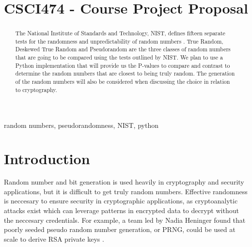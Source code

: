 \documentclass[11pt,letterpaper,conference]{IEEEtran}
\begin{document}
\title{CSCI474 - Course Project Proposal}

\author{
\and
{}
\and
{}
\and
{}
\and
{}
\and
{}
}

\maketitle

\begin{abstract}
The National Institute of Standards and Technology, NIST, defines fifteen separate tests
for the randomness and unpredictability of random numbers \cite{nistbook}. True Random, Deskewed True
Random and Pseudorandom are the three classes of random numbers that are going to be
compared using the tests outlined by NIST. We plan to use a Python implementation that will
provide us the P-values to compare and contrast to determine the random numbers that are
closest to being truly random. The generation of the random numbers will also be considered
when discussing the choice in relation to cryptography.
\end{abstract}

\begin{IEEEkeywords}
random numbers, pseudorandomness, NIST, python
\end{IEEEkeywords}

\section{Introduction}
Random number and bit generation is used heavily in cryptography and security applications, but it
is difficult to get truly random numbers. Effective randomness is neccesary to ensure security in
cryptographic applications, as cryptoanalytic attacks exist which can leverage patterns in encrypted
data to decrypt without the neccesary credentials. For example, a team led by Nadia Heninger found
that poorly seeded pseudo random number generation, or PRNG, could be used at scale to derive RSA
private keys \cite{heninger2012mining}.
\end{document}
